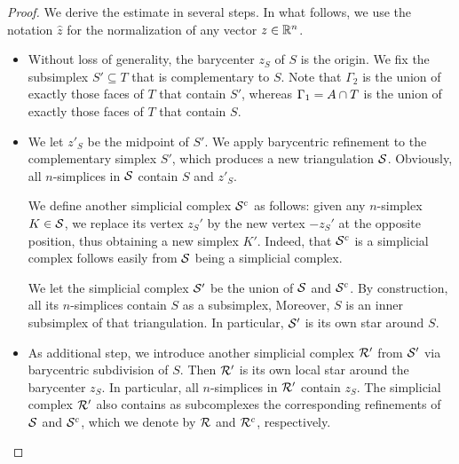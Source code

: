 \documentclass[10pt,a4paper]{article}
\begin{document}
\begin{proof}
    We derive the estimate in several steps. 
    In what follows, we use the notation $\hat z$ for the normalization of any vector $z \in {\mathbb R}^{n}$.
    \begin{itemize}
        \item 
        Without loss of generality, the barycenter $z_{S}$ of $S$ is the origin. 
        We fix the subsimplex $S' \subseteq T$ that is complementary to $S$.
        Note that ${\Gamma_2}$ is the union of exactly those faces of $T$ that contain $S'$,
        whereas ${\Gamma_1} = A \cap T$ is the union of exactly those faces of $T$ that contain $S$. 
        
        
        \item 
        We let $z'_{S}$ be the midpoint of $S'$. 
        We apply barycentric refinement to the complementary simplex $S'$, which produces a new triangulation ${\mathcal S}$. 
        Obviously, all $n$-simplices in ${\mathcal S}$ contain $S$ and $z'_{S}$.
        
        We define another simplicial complex ${\mathcal S}^c$ as follows:
        given any $n$-simplex $K \in {\mathcal S}$, 
        we replace its vertex $z_{S}'$ by the new vertex $-z_{S}'$ at the opposite position,
        thus obtaining a new simplex $K'$. 
        Indeed, that ${\mathcal S}^c$ is a simplicial complex follows easily from ${\mathcal S}$ being a simplicial complex. 
        
        We let the simplicial complex ${\mathcal S}'$ be the union of ${\mathcal S}$ and ${\mathcal S}^c$. 
        By construction, all its $n$-simplices contain $S$ as a subsimplex,
        Moreover, $S$ is an inner subsimplex of that triangulation. 
        In particular, ${\mathcal S}'$ is its own star around $S$.
        
        
        \item 
        As additional step, we introduce another simplicial complex ${\mathcal R}'$ from ${\mathcal S}'$ via barycentric subdivision of $S$.
        Then ${\mathcal R}'$ is its own local star around the barycenter $z_S$.
        In particular, all $n$-simplices in ${\mathcal R}'$ contain $z_{S}$. 
        The simplicial complex ${\mathcal R}'$ also contains as subcomplexes the corresponding refinements of ${\mathcal S}$ and ${\mathcal S}^{c}$, 
        which we denote by ${\mathcal R}$ and ${\mathcal R}^{c}$, respectively.
        

\end{itemize}
\end{proof}
\end{document}
